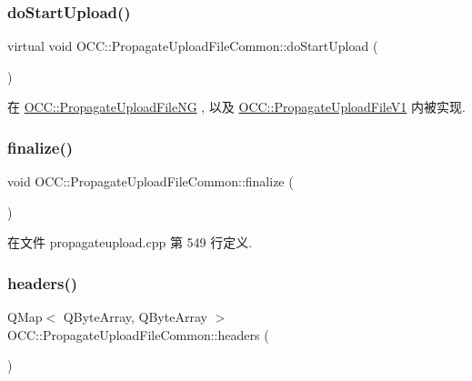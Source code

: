 \subsubsection{\texorpdfstring{do\+Start\+Upload()}{doStartUpload()}}
{\footnotesize\ttfamily virtual void O\+C\+C\+::\+Propagate\+Upload\+File\+Common\+::do\+Start\+Upload (\begin{DoxyParamCaption}{ }\end{DoxyParamCaption})\hspace{0.3cm}{\ttfamily [pure virtual]}}



在 \hyperlink{class_o_c_c_1_1_propagate_upload_file_n_g_ae601085b44092a20f669a91dadb13e8d}{O\+C\+C\+::\+Propagate\+Upload\+File\+NG} , 以及 \hyperlink{class_o_c_c_1_1_propagate_upload_file_v1_ae868275c2eda03e0e6f83b1e9b8b5e54}{O\+C\+C\+::\+Propagate\+Upload\+File\+V1} 内被实现.

\mbox{\label{class_o_c_c_1_1_propagate_upload_file_common_af7ccc7680c669f640ecd3bd40ee5e834}} 
\subsubsection{\texorpdfstring{finalize()}{finalize()}}
{\footnotesize\ttfamily void O\+C\+C\+::\+Propagate\+Upload\+File\+Common\+::finalize (\begin{DoxyParamCaption}{ }\end{DoxyParamCaption})}



在文件 propagateupload.\+cpp 第 549 行定义.

\mbox{\label{class_o_c_c_1_1_propagate_upload_file_common_a70de38935ddd7eabe60ae08df6e880c4}} 
\subsubsection{\texorpdfstring{headers()}{headers()}}
{\footnotesize\ttfamily Q\+Map$<$ Q\+Byte\+Array, Q\+Byte\+Array $>$ O\+C\+C\+::\+Propagate\+Upload\+File\+Common\+::headers (\begin{DoxyParamCaption}{ }\end{DoxyParamCaption})\hspace{0.3cm}{\ttfamily [protected]}}



